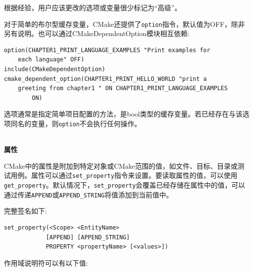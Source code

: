 根据经验，用户应该更改的选项或变量很少标记为“高级”。

对于简单的布尔型缓存变量，CMake还提供了\texttt{option}指令，默认值为OFF，除非另有说明。也可以通过CMakeDependentOption模块相互依赖:

\begin{lstlisting}[style=styleCMake]
option(CHAPTER1_PRINT_LANGUAGE_EXAMPLES "Print examples for 
	each language" OFF)
include(CMakeDependentOption)
cmake_dependent_option(CHAPTER1_PRINT_HELLO_WORLD "print a
	greeting from chapter1 " ON CHAPTER1_PRINT_LANGUAGE_EXAMPLES
		ON)
\end{lstlisting}

选项通常是指定简单项目配置的方法，是bool类型的缓存变量。若已经存在与该选项同名的变量，则\texttt{option}不会执行任何操作。

\hspace*{\fill} \\ %
\noindent
\textbf{属性}

CMake中的属性是附加到特定对象或CMake范围的值，如文件、目标、目录或测试用例。属性可以通过\texttt{set\_property}指令来设置。要读取属性的值，可以使用\texttt{get\_property}。默认情况下，\texttt{set\_property}会覆盖已经存储在属性中的值，可以通过传递\texttt{APPEND}或\texttt{APPEND\_STRING}将值添加到当前值中。

完整签名如下:

\begin{lstlisting}[style=styleCMake]
set_property(<Scope> <EntityName>
			[APPEND] [APPEND_STRING]
			PROPERTY <propertyName> [<values>])
\end{lstlisting}

作用域说明符可以有以下值:

